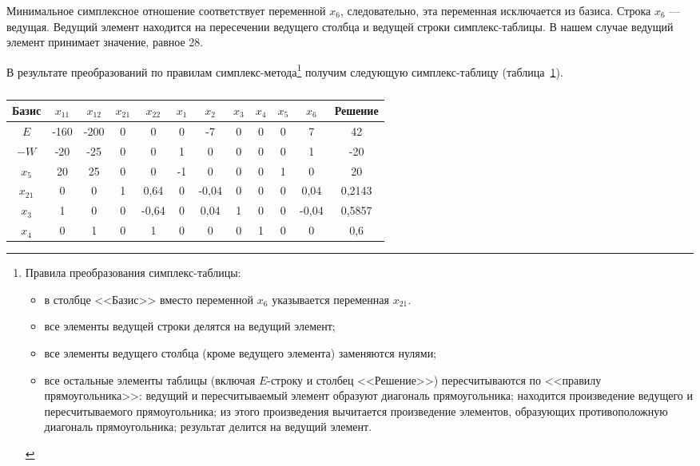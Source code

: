 Минимальное симплексное отношение соответствует переменной $ x_{6} $, следовательно,
эта переменная исключается из базиса. Строка $ x_{6} $ --- ведущая.
Ведущий элемент находится на пересечении ведущего столбца и
ведущей строки симплекс-таблицы. В нашем случае ведущий элемент принимает значение,
равное 28.

В результате преобразований по правилам симплекс-метода\footnote{
Правила преобразования симплекс-таблицы:
\begin{itemize}
\item в столбце <<Базис>> вместо переменной $ x_{6} $ указывается переменная $ x_{21} $.
\item все элементы ведущей строки делятся на ведущий элемент;
\item все элементы ведущего столбца (кроме ведущего элемента) заменяются нулями;
\item все остальные элементы таблицы (включая $ E $-строку и столбец <<Решение>>)
  пересчитываются по <<правилу прямоугольника>>:
  ведущий и пересчитываемый элемент образуют диагональ прямоугольника;
  находится произведение ведущего и пересчитываемого прямоугольника;
  из этого произведения вычитается произведение элементов,
  образующих противоположную диагональ прямоугольника; результат делится
  на ведущий элемент.
\end{itemize}}
получим 
следующую симплекс-таблицу (таблица~\ref{tbl:Simplex1_2}).

\renewcommand{\tabcolsep}{0.45em}
\begin{table}[h]
  \centering
    \caption{\label{tbl:Simplex1_2}}
    \begin{tabular}{|c|c|c|c|c|c|c|c|c|c|c|c|}
      \hline
      Базис & $ x_{11} $ & $ x_{12} $ & $ x_{21} $ & $ x_{22} $ & $ x_{1} $ & $ x_{2} $ & $ x_{3} $ & $ x_{4} $ & $ x_{5} $ & $ x_{6} $ & Решение \\  
      \hline
      $ E $ & -160 & -200 & 0 & 0 & 0 & -7 & 0 & 0 & 0 & 7 & 42 \\  
      \hline
      $ -W $ & -20 & -25 & 0 & 0 & 1 & 0 & 0 & 0 & 0 & 1 & -20 \\  
      \hline
      $ x_{5} $ & 20 & 25 & 0 & 0 & -1 & 0 & 0 & 0 & 1 & 0 & 20 \\  
      \hline
      $ x_{21} $ & 0 & 0 & 1 & 0{,}64 & 0 & -0{,}04 & 0 & 0 & 0 & 0{,}04 & 0{,}2143 \\  
      \hline
      $ x_{3} $ & 1 & 0 & 0 & -0{,}64 & 0 & 0{,}04 & 1 & 0  & 0 & -0{,}04 & 0{,}5857 \\  
      \hline
      $ x_{4} $ & 0 & 1 & 0 & 1 & 0 & 0 & 0 & 1 & 0 & 0 & 0{,}6 \\  
      \hline
    \end{tabular}
\end{table}

